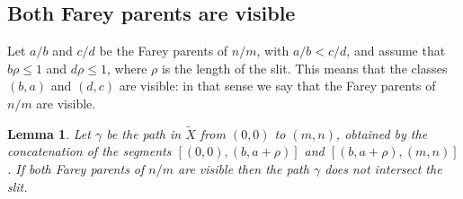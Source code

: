 \documentclass{article}
\newtheorem{lemma}[thm]{Lemma}
\theoremstyle{definition}
\begin{document}
\subsection{Both Farey parents are visible }

Let $a/b$ and $c/d$ be the Farey parents of $n/m$, with $a/b<c/d$, and assume that $ b\rho \le 1$ and $d\rho\le 1$, where $\rho$ is the length of the slit. This means that the classes $(b,a)$ and $(d,c)$ are visible: in that sense we say that the Farey parents of $n/m$ are visible.

\begin{lemma}
Let $\gamma$ be the path in $\tilde{X}$ from $(0,0)$ to $(m,n)$, obtained by the concatenation of the segments  $[(0,0), (b,a+\rho)]$ and $[(b,a+\rho),(m,n)]$.
	If both Farey parents of $n/m$ are visible then the path $\gamma$ does not intersect the slit.
\end{lemma}
\end{document}
